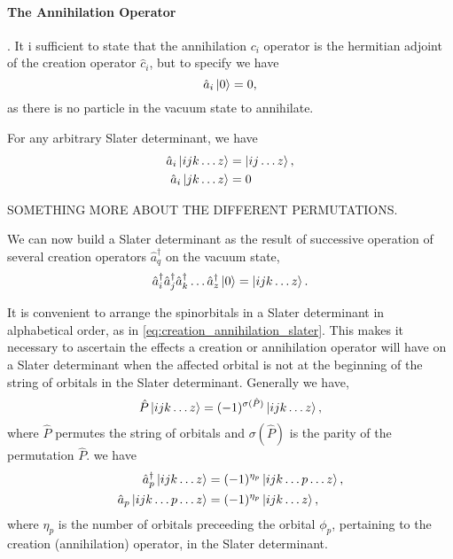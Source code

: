     \paragraph{The Annihilation Operator}. It i sufficient to state that the 
    annihilation $c_i$ operator is the hermitian adjoint of the creation operator
    $\hat{c}_i$, but to specify we have
    \begin{equation}
        \hat{a}_i\ket{0} = 0,
    \end{equation}
    as there is no particle in the vacuum state to annihilate. 

    For any arbitrary Slater determinant, we have 
    \begin{align}
        \hat{a}_i \ket{ijk \dots z} &= \ket{ij \dots z}, \\
        \hat{a}_i \ket{jk \dots z} &= 0       
    \end{align}

    SOMETHING MORE ABOUT THE DIFFERENT PERMUTATIONS.

    We can now build a Slater determinant as the result of successive operation of
    several creation operators $\hat{a}_q^\dagger$ on the vacuum state,
    \begin{equation}
        \label{eq:creation_annihilation_slater}
        \hat{a}^\dagger_i \hat{a}^\dagger_j \hat{a}^\dagger_k \dots \hat{a}^\dagger_z
        \ket{0} = \ket{ijk \dots z}.
    \end{equation}

    It is convenient to arrange the spinorbitals in a Slater determinant in
    alphabetical order, as in \autoref{eq:creation_annihilation_slater}. This 
    makes it necessary to ascertain the effects a creation or annihilation
    operator will have on a Slater determinant when the affected orbital is
    not at the beginning of the string of orbitals in the Slater determinant.
    Generally we have,
    \begin{equation}
        \hat{P} \ket{ijk \dots z} = (-1)^{\sigma(\hat{P})} \ket{ijk \dots z},
    \end{equation}
    where $\hat{P}$ permutes the string of orbitals and $\sigma(\hat{P})$ is the
    parity of the permutation $\hat{P}$. we have
    \begin{align}
        \hat{a}_p^\dagger \ket{ijk \dots z} &= 
            (-1)^{\eta_p} \ket{ijk \dots p \dots z}, \\
        \hat{a}_p \ket{ijk \dots p \dots z} &=
            (-1)^{\eta_p} \ket{ijk \dots z},
    \end{align}
    where $\eta_p$ is the number of orbitals preceeding the orbital $\phi_p$, pertaining
    to the creation (annihilation) operator, in the Slater determinant.

